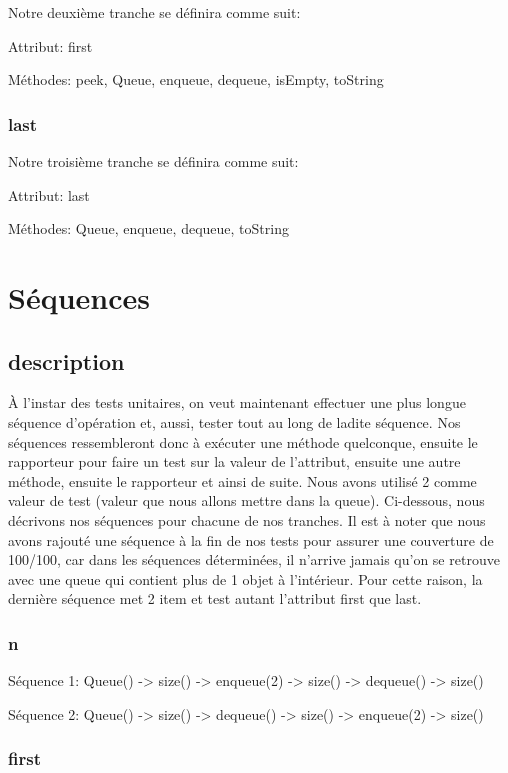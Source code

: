 \documentclass[11pt]{article}
\begin{document}
Notre deuxième tranche se définira comme suit:

Attribut: first

Méthodes: peek, Queue, enqueue, dequeue, isEmpty, toString

\subsubsection{last}

Notre troisième tranche se définira comme suit:

Attribut: last

Méthodes: Queue, enqueue, dequeue, toString

\section{Séquences}
\subsection{description}

À l'instar des tests unitaires, on veut maintenant effectuer une plus longue séquence d'opération et, aussi, tester tout au long de ladite séquence.
Nos séquences ressembleront donc à exécuter une méthode quelconque, ensuite le rapporteur pour faire un test sur la valeur de l'attribut, ensuite une autre méthode, ensuite le rapporteur et ainsi de suite.
Nous avons utilisé 2 comme valeur de test (valeur que nous allons mettre dans la queue).
Ci-dessous, nous décrivons nos séquences pour chacune de nos tranches.
Il est à noter que nous avons rajouté une séquence à la fin de nos tests pour assurer une couverture de 100/100, car dans les séquences déterminées, il n'arrive jamais qu'on se retrouve avec une queue qui contient plus de 1 objet à l'intérieur.
Pour cette raison, la dernière séquence met 2 item et test autant l'attribut first que last.

\subsubsection{n}

Séquence 1:
Queue() -> size() -> enqueue(2) -> size() -> dequeue() -> size()

Séquence 2:
Queue() -> size() -> dequeue() -> size() -> enqueue(2) -> size()

\subsubsection{first}
\end{document}
